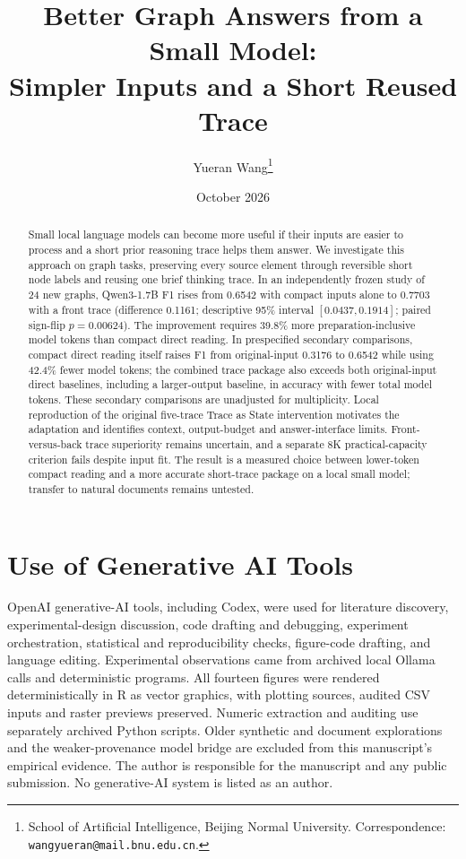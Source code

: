 \documentclass[10pt]{article}
\title{\textbf{Better Graph Answers from a Small Model:\\
Simpler Inputs and a Short Reused Trace}}
\author{Yueran Wang\thanks{School of Artificial Intelligence, Beijing Normal University. Correspondence: \texttt{wangyueran@mail.bnu.edu.cn}.}}
\date{October 2026}
\begin{document}
\ifdefined\XeTeXversion{}\fi

\maketitle

\begin{abstract}
Small local language models can become more useful if their inputs are easier to process and a short prior reasoning trace helps them answer. We investigate this approach on graph tasks, preserving every source element through reversible short node labels and reusing one brief thinking trace. In an independently frozen study of 24 new graphs, Qwen3-1.7B F1 rises from 0.6542 with compact inputs alone to 0.7703 with a front trace (difference 0.1161; descriptive 95\% interval $[0.0437,0.1914]$; paired sign-flip $p=0.00624$). The improvement requires 39.8\% more preparation-inclusive model tokens than compact direct reading. In prespecified secondary comparisons, compact direct reading itself raises F1 from original-input 0.3176 to 0.6542 while using 42.4\% fewer model tokens; the combined trace package also exceeds both original-input direct baselines, including a larger-output baseline, in accuracy with fewer total model tokens. These secondary comparisons are unadjusted for multiplicity. Local reproduction of the original five-trace Trace as State intervention motivates the adaptation and identifies context, output-budget and answer-interface limits. Front-versus-back trace superiority remains uncertain, and a separate 8K practical-capacity criterion fails despite input fit. The result is a measured choice between lower-token compact reading and a more accurate short-trace package on a local small model; transfer to natural documents remains untested.
\end{abstract}



\section*{Use of Generative AI Tools}

OpenAI generative-AI tools, including Codex, were used for literature discovery, experimental-design discussion, code drafting and debugging, experiment orchestration, statistical and reproducibility checks, figure-code drafting, and language editing. Experimental observations came from archived local Ollama calls and deterministic programs. All fourteen figures were rendered deterministically in R as vector graphics, with plotting sources, audited CSV inputs and raster previews preserved. Numeric extraction and auditing use separately archived Python scripts. Older synthetic and document explorations and the weaker-provenance model bridge are excluded from this manuscript's empirical evidence. The author is responsible for the manuscript and any public submission. No generative-AI system is listed as an author.
\end{document}
